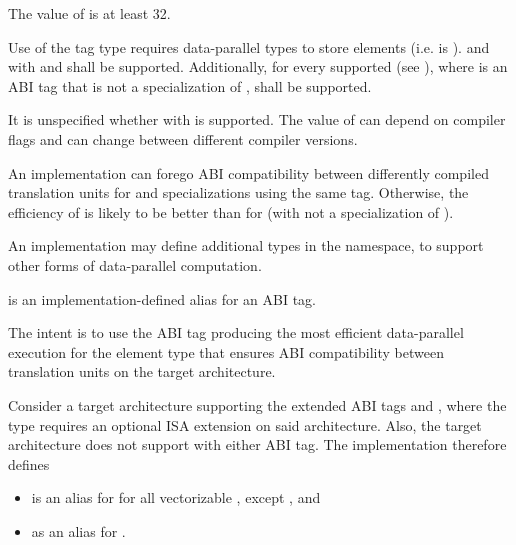 \pnum
The value of  is at least 32.

\pnum
Use of the  tag type requires data-parallel types to store  elements (i.e.  is ).  and  with  and  shall be supported. Additionally, for every supported  (see ), where  is an ABI tag that is not a specialization of ,  shall be supported.

\pnum
\begin{note}It is unspecified whether  with  is supported. The value of  can depend on compiler flags and can change between different compiler versions.\end{note}

\pnum
\begin{note}An implementation can forego ABI compatibility between differently compiled translation units for  and  specializations using the same  tag. Otherwise, the efficiency of  is likely to be better than for  (with  not a specialization of ).\end{note}

\pnum
An implementation may define additional  types in the  namespace, to support other forms of data-parallel computation.

\pnum
{} is an implementation-defined alias for an ABI tag. \begin{note}The intent is to use the ABI tag producing the most efficient data-parallel execution for the element type  that ensures ABI compatibility between translation units on the target architecture.\end{note}

\begin{example}
  Consider a target architecture supporting the extended ABI tags  and , where the  type requires an optional ISA extension on said architecture. Also, the target architecture does not support  with either ABI tag. The implementation therefore defines
  \begin{itemize}
    \item {} is an alias for  for all vectorizable , except , and
    \item {} as an alias for .
  \end{itemize}
\end{example}

